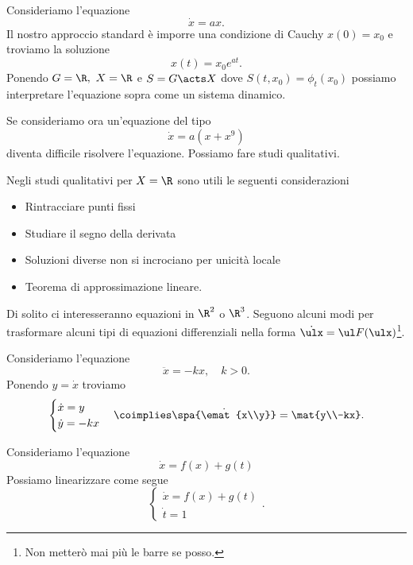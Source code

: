 \begin{example}
Consideriamo l'equazione
\[\dot x=ax.\]
Il nostro approccio standard \`e imporre una condizione di Cauchy $x(0)=x_0$ e troviamo la soluzione
\[x(t)=x_0e^{at}.\]
Ponendo $G=\R,\ X=\R$ e $S=G\acts X$ dove $S(t,x_0)=\phi_t(x_0)$ possiamo interpretare l'equazione sopra come un sistema dinamico.

\noindent
Se consideriamo ora un'equazione del tipo
\[\dot x=a(x+x^9)\]
diventa difficile risolvere l'equazione. Possiamo fare studi qualitativi.

\noindent Negli studi qualitativi per $X=\R$ sono utili le seguenti considerazioni
\begin{itemize}
\item Rintracciare punti fissi
\item Studiare il segno della derivata
\item Soluzioni diverse non si incrociano per unicit\`a locale
\item Teorema di approssimazione lineare.
\end{itemize}
\end{example}

\noindent Di solito ci interesseranno equazioni in $\R^2$ o $\R^3$. Seguono alcuni modi per trasformare alcuni tipi di equazioni differenziali nella forma $\dot \ulx=\ul F(\ulx)$\footnote{Non metter\`o mai pi\`u le barre se posso.}.
\begin{example}
Consideriamo l'equazione
\[\ddot x=-kx,\quad k>0.\]
Ponendo $y=\dot x$ troviamo
\[\begin{cases}
\dot x=y\\
\dot y=-kx
\end{cases}\coimplies \dot{\spa{\emat{x\\y}}}=\mat{y\\-kx}.\]
\end{example}

\begin{example}
Consideriamo l'equazione
\[\dot x=f(x)+g(t)\]
Possiamo linearizzare come segue
\[\begin{cases}
\dot x=f(x)+g(t)\\
\dot t=1
\end{cases}.\]
\end{example}


